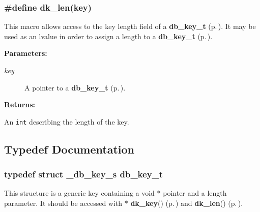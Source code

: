 \subsubsection{\setlength{\rightskip}{0pt plus 5cm}\#define dk\_\-len(key)}\label{group__dbprim__key_a3}




 This macro allows access to the key length field of a {\bf db\_\-key\_\-t} {\rm (p.\,\pageref{group__dbprim__key_a0})}. It may be used as an lvalue in order to assign a length to a {\bf db\_\-key\_\-t} {\rm (p.\,\pageref{group__dbprim__key_a0})}.\begin{Desc}
\item[{\bf Parameters: }]\par
\begin{description}
\item[
{\em key}]A pointer to a {\bf db\_\-key\_\-t} {\rm (p.\,\pageref{group__dbprim__key_a0})}. \end{description}
\end{Desc}
\begin{Desc}
\item[{\bf Returns: }]\par
An {\tt int} describing the length of the key. \end{Desc}


\subsection{Typedef Documentation}
\subsubsection{\setlength{\rightskip}{0pt plus 5cm}typedef struct \_\-db\_\-key\_\-s db\_\-key\_\-t}\label{group__dbprim__key_a0}




 This structure is a generic key containing a void $\ast$ pointer and a length parameter. It should be accessed with $\ast$ {\bf dk\_\-key}() {\rm (p.\,\pageref{group__dbprim__key_a2})} and {\bf dk\_\-len}() {\rm (p.\,\pageref{group__dbprim__key_a3})}. 